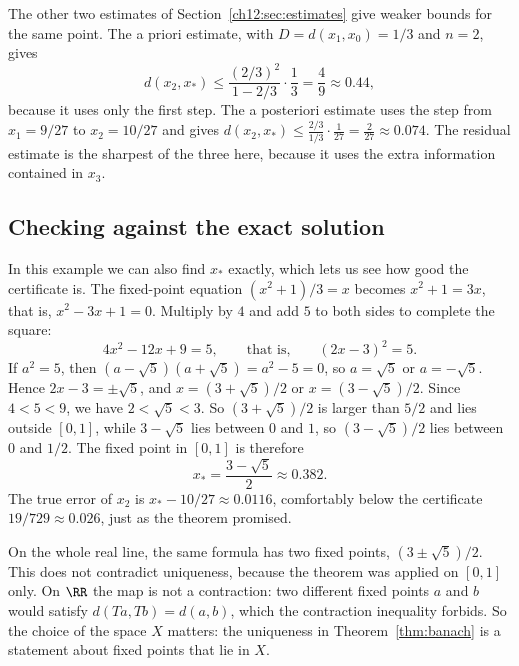 The other two estimates of Section~\ref{ch12:sec:estimates} give weaker bounds for the same point. The a priori estimate, with $D=d(x_1,x_0)=1/3$ and $n=2$, gives
\[
d(x_2,x_*)\le\frac{(2/3)^2}{1-2/3}\cdot\frac13=\frac49\approx0.44,
\]
because it uses only the first step. The a posteriori estimate uses the step from $x_1=9/27$ to $x_2=10/27$ and gives $d(x_2,x_*)\le\frac{2/3}{1/3}\cdot\frac1{27}=\frac2{27}\approx0.074$. The residual estimate is the sharpest of the three here, because it uses the extra information contained in $x_3$.

\subsection*{Checking against the exact solution}
In this example we can also find $x_*$ exactly, which lets us see how good the certificate is. The fixed-point equation $(x^2+1)/3=x$ becomes $x^2+1=3x$, that is, $x^2-3x+1=0$. Multiply by $4$ and add $5$ to both sides to complete the square:
\[
4x^2-12x+9=5,\qquad\text{that is,}\qquad(2x-3)^2=5.
\]
If $a^2=5$, then $(a-\sqrt5)(a+\sqrt5)=a^2-5=0$, so $a=\sqrt5$ or $a=-\sqrt5$. Hence $2x-3=\pm\sqrt5$, and $x=(3+\sqrt5)/2$ or $x=(3-\sqrt5)/2$. Since $4<5<9$, we have $2<\sqrt5<3$. So $(3+\sqrt5)/2$ is larger than $5/2$ and lies outside $[0,1]$, while $3-\sqrt5$ lies between $0$ and $1$, so $(3-\sqrt5)/2$ lies between $0$ and $1/2$. The fixed point in $[0,1]$ is therefore
\[
x_*=\frac{3-\sqrt5}{2}\approx0.382.
\]
The true error of $x_2$ is $x_*-10/27\approx0.0116$, comfortably below the certificate $19/729\approx0.026$, just as the theorem promised.

On the whole real line, the same formula has two fixed points, $(3\pm\sqrt5)/2$. This does not contradict uniqueness, because the theorem was applied on $[0,1]$ only. On $\RR$ the map is not a contraction: two different fixed points $a$ and $b$ would satisfy $d(Ta,Tb)=d(a,b)$, which the contraction inequality forbids. So the choice of the space $X$ matters: the uniqueness in Theorem~\ref{thm:banach} is a statement about fixed points that lie in $X$.
